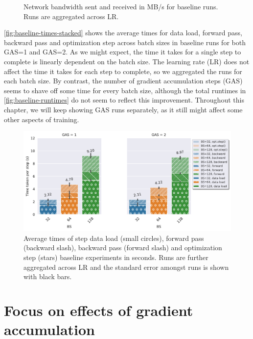 \begin{figure}[h]
\begin{subfigure}[b]{0.475 \textwidth}
    \end{subfigure}%
    \hfill
    \caption{Network bandwidth sent and received in MB/s for baseline runs. Runs are aggregated across LR.}
\end{figure}

\autoref{fig:baseline-times-stacked} shows the average times for data load, forward pass, backward pass and optimization step across batch sizes in baseline runs for both GAS=1 and GAS=2.
As we might expect, the time it takes for a single step to complete is linearly dependent on the batch size.
The learning rate (LR) does not affect the time it takes for each step to complete, so we aggregated the runs for each batch size.
By contrast, the number of gradient accumulation steps (GAS) seems to shave off some time for every batch size, although the total runtimes in \autoref{fig:baseline-runtimes} do not seem to reflect this improvement.
Throughout this chapter, we will keep showing GAS runs separately, as it still might affect some other aspects of training.

\begin{figure}[h]
    \centering
    \includegraphics[width=\textwidth]{./figures/06_barplot-times_baseline-16vCPUs-GAS-1.pdf}
    \caption{
        Average times of step data load (small circles), forward pass (backward slash), backward pass (forward slash) and optimization step (stars) baseline experiments in seconds.
        Runs are further aggregated across LR and the standard error amongst runs is shown with black bars.
    }
    \label{fig:baseline-times-stacked}
\end{figure}



\section{Focus on effects of gradient accumulation}

